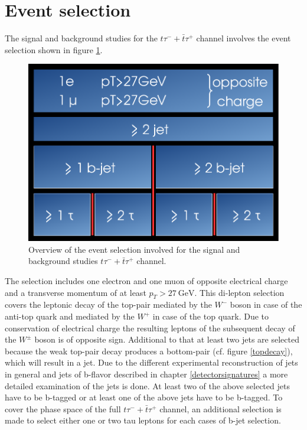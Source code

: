 \section{Event selection}\label{eventselection}
The signal and background studies for the $t\tau^{-}+\bar{t}\tau^{+}$ channel involves the event selection shown in figure \ref{selection}.\newline
%
\begin{figure}[htbp]                                 
 \begin{center}                                       
  \includegraphics[width=0.45\linewidth]{figures/selection.pdf} 
   \caption[Overview of the event selection.]{Overview of the event selection involved for the signal and background studies $t\tau^{-}+\bar{t}\tau^{+}$ channel.}
  \label{selection}                                    
 \end{center}
\end{figure}
%
The selection includes one electron and one muon of opposite electrical charge and a transverse momentum of at least $p_T>\SI{27}{\giga\electronvolt}$. This di-lepton selection covers the leptonic decay of the top-pair mediated by the $W^-$ boson in case of the anti-top quark and mediated by the $W^+$ in case of the top quark. Due to conservation of electrical charge the resulting leptons of the subsequent decay of the $W^\pm$ boson is of opposite sign. Additional to that at least two jets are selected because the weak top-pair decay produces a bottom-pair (cf. figure \ref{topdecay}), which will result in a jet. Due to the different experimental reconstruction of jets in general and jets of b-flavor described in chapter \ref{detectorsignatures} a more detailed examination of the jets is done. At least two of the above selected jets have to be b-tagged or at least one of the above jets have to be b-tagged. To cover the phase space of the full $t\tau^{-}+\bar{t}\tau^{+}$ channel, an additional selection is made to select either one or two tau leptons for each cases of b-jet selection.    
